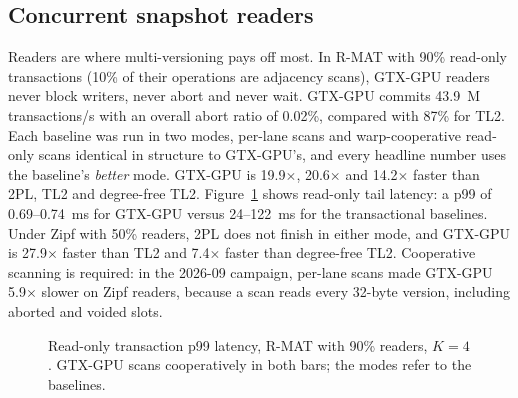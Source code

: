 \documentclass[sigconf,nonacm]{acmart}
\newcommand{\sys}{GTX-GPU}
\begin{document}
\subsection{Concurrent snapshot readers}
\label{sec:readers}
Readers are where multi-versioning pays off most. In R-MAT with 90\% read-only transactions (10\% of their operations
are adjacency scans), \sys{} readers never block writers, never abort and never wait. \sys{} commits 43.9~M
transactions/s with an overall abort ratio of 0.02\%, compared with 87\% for TL2. Each baseline was run in two modes,
per-lane scans and warp-cooperative read-only scans identical in structure to \sys{}'s, and every headline number uses
the baseline's \emph{better} mode. \sys{} is 19.9$\times$, 20.6$\times$ and 14.2$\times$ faster than 2PL, TL2 and
degree-free TL2. Figure~\ref{fig:latency} shows read-only tail latency: a p99 of 0.69--0.74~ms for \sys{} versus
24--122~ms for the transactional baselines. Under Zipf with 50\% readers, 2PL does not finish in either mode, and
\sys{} is 27.9$\times$ faster than TL2 and 7.4$\times$ faster than degree-free TL2. Cooperative scanning is required:
in the 2026-09 campaign, per-lane scans made \sys{} 5.9$\times$ slower on Zipf readers, because a scan reads every
32-byte version, including aborted and voided slots.

\begin{figure}[t]
\centering
{}
\caption{Read-only transaction p99 latency, R-MAT with 90\% readers, $K{=}4$. \sys{} scans cooperatively in both
bars; the modes refer to the baselines.}
\label{fig:latency}
\end{figure}
\end{document}
